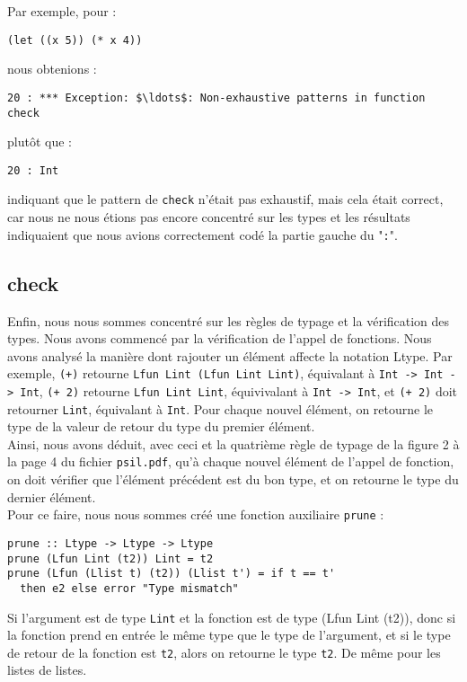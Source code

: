 \documentclass[10pt,a4paper]{article}
\begin{document}
Par exemple, pour :

\begin{lstlisting}
(let ((x 5)) (* x 4))
\end{lstlisting}

nous obtenions :

\begin{lstlisting}
20 : *** Exception: $\ldots$: Non-exhaustive patterns in function check
\end{lstlisting}

plutôt que :

\begin{lstlisting}
20 : Int
\end{lstlisting}

indiquant que le pattern de \texttt{check} n'était pas exhaustif, mais cela était correct, car nous ne nous étions pas encore concentré sur les types et les résultats indiquaient que nous avions correctement codé la partie gauche du "\texttt{:}".\\

\subsection{check}

Enfin, nous nous sommes concentré sur les règles de typage et la vérification des types. Nous avons commencé par la vérification de l'appel de fonctions. Nous avons analysé la manière dont rajouter un élément affecte la notation Ltype. Par exemple, \texttt{(+)} retourne \texttt{Lfun Lint (Lfun Lint Lint)}, équivalant à \texttt{Int -> Int -> Int}, \texttt{(+ 2)} retourne \texttt{Lfun Lint Lint}, équivivalant à \texttt{Int -> Int}, et \texttt{(+ 2)} doit retourner \texttt{Lint}, équivalant à \texttt{Int}. Pour chaque nouvel élément, on retourne le type de la valeur de retour du type du premier élément. \\ 

Ainsi, nous avons déduit, avec ceci et la quatrième règle de typage de la figure 2 à la page 4 du fichier \texttt{psil.pdf}, qu'à chaque nouvel élément de l'appel de fonction, on doit vérifier que l'élément précédent est du bon type, et on retourne le type du dernier élément.\\

Pour ce faire, nous nous sommes créé une fonction auxiliaire \texttt{prune} :

\begin{lstlisting}
prune :: Ltype -> Ltype -> Ltype
prune (Lfun Lint (t2)) Lint = t2
prune (Lfun (Llist t) (t2)) (Llist t') = if t == t'
  then e2 else error "Type mismatch"
\end{lstlisting}

Si l'argument est de type \texttt{Lint} et la fonction est de type (Lfun Lint (t2)), donc si la fonction prend en entrée le même type que le type de l'argument, et si le type de retour de la fonction est \texttt{t2}, alors on retourne le type \texttt{t2}. De même pour les listes de listes.
\end{document}
